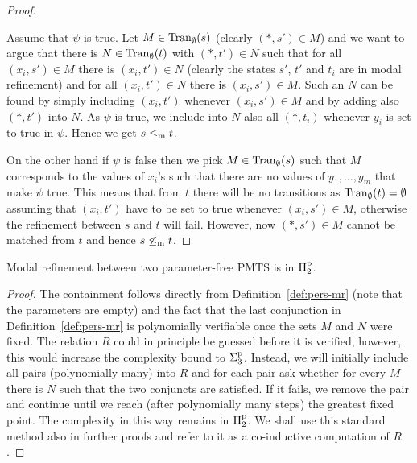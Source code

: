 \begin{proof}
\begin{center}
\end{center}


















\smallskip

Assume that $\psi$ is true. Let 
$M \in \mathrm{Tran}_{\emptyset}(s)$ (clearly $(*,s') \in M$) and we want to argue
that there is $N \in \mathrm{Tran}_{\emptyset}(t)$ with $(*,t') \in N$ such that
for all $(x_i,s') \in M$  there is $(x_i,t') \in N$ (clearly the 
states $s'$, $t'$ and $t_i$ are in modal refinement)
and for all $(x_i,t') \in N$ there is $(x_i,s') \in M$.
Such an $N$ can be found by simply including 
$(x_i,t')$ whenever $(x_i,s') \in M$ and by adding
also $(*,t')$ into $N$. As $\psi$ is true, we include into $N$
also all $(*,t_i)$ whenever $y_i$ is set to true in $\psi$.
Hence we get $s \le_\mathrm m t$.

On the other hand if $\psi$ is false then we pick
$M \in \mathrm{Tran}_{\emptyset}(s)$ such that $M$ corresponds to the
values of $x_i$'s such that there are no values of 
$y_1, \ldots, y_m$ that make $\psi$ true. This means that from 
$t$ there will be no transitions as $\mathrm{Tran}_{\emptyset}(t)= \emptyset$
assuming that $(x_i,t')$ have to be set to true whenever
$(x_i,s') \in M$, otherwise the refinement between $s$ and $t$ will fail.
However, now $(*,s') \in M$ cannot be matched from 
$t$ and hence $s \not\le_\mathrm m t$.





\end{proof}

\begin{proposition} \label{prop:coinduction}
Modal refinement between two parameter-free PMTS is in $\mathrm\Pi^\mathrm p_2$.
\end{proposition}
\begin{proof}
The containment follows directly from Definition~\ref{def:pers-mr} 
(note that the parameters are empty) and 
the fact that the last conjunction 
in Definition~\ref{def:pers-mr} is polynomially verifiable 
once the sets $M$ and $N$ were fixed.
The relation $R$ could in principle be guessed before
it is verified, however, this would increase the complexity bound
to $\mathrm\Sigma^\mathrm p_3$.  Instead, we will initially include all 
pairs (polynomially many) into $R$ and for each pair 
ask whether for every $M$ there is $N$ such that the two
conjuncts are satisfied. If it fails, we remove the pair and 
continue until we reach (after
polynomially many steps) the greatest fixed point. The complexity in
this way remains in $\mathrm\Pi^\mathrm p_2$. We shall use this standard method 
also in further proofs
and refer to it as a co-inductive computation of $R$.


\end{proof}


